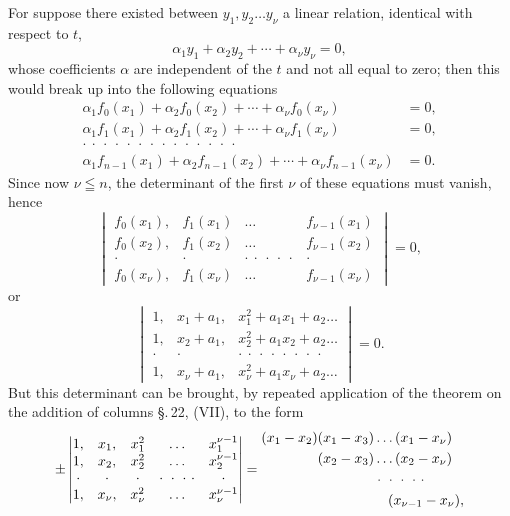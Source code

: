

For suppose there existed between $y_1, y_2 \ldots y_\nu$ a linear
relation, identical with respect to $t$,
\[
\alpha_1 y_1 + \alpha_2 y_2 + \cdots + \alpha_\nu y_\nu = 0,
\]
whose coefficients $\alpha$ are independent of the $t$ and not all equal
to zero; then this would break up into the following equations
\[
\begin{aligned}
\alpha_1 f_0(x_1) + \alpha_2 f_0(x_2) + \cdots + \alpha_\nu f_0(x_\nu) &= 0, \\
\alpha_1 f_1(x_1) + \alpha_2 f_1(x_2) + \cdots + \alpha_\nu f_1(x_\nu) &= 0, \\
\cdot\ \cdot\ \cdot\ \cdot\ \cdot\ \cdot\ \cdot\ \cdot\ \cdot\ \cdot\ \cdot\ \cdot\ \cdot\ \cdot & \\
\alpha_1 f_{n-1}(x_1) + \alpha_2 f_{n-1}(x_2) + \cdots + \alpha_\nu f_{n-1}(x_\nu) &= 0.
\end{aligned}
\]
Since now $\nu \leqq n$,
the determinant of the first $\nu$
of these equations must vanish, hence
\[
\begin{vmatrix}
f_0(x_1), & f_1(x_1) & \ldots & f_{\nu-1}(x_1) \\
f_0(x_2), & f_1(x_2) & \ldots & f_{\nu-1}(x_2) \\
\cdot & \cdot & \cdot\ \cdot\ \cdot\ \cdot\ \cdot & \cdot \\
f_0(x_\nu), & f_1(x_\nu) & \ldots & f_{\nu-1}(x_\nu)
\end{vmatrix}
= 0,
\]
or
\[
\begin{vmatrix}
1, & x_1 + a_1, & x_1^2 + a_1 x_1 + a_2 \ldots \\
1, & x_2 + a_1, & x_2^2 + a_1 x_2 + a_2 \ldots \\
\cdot & \cdot & \cdot\ \cdot\ \cdot\ \cdot\ \cdot\ \cdot\ \cdot\ \cdot \\
1, & x_\nu + a_1, & x_\nu^2 + a_1 x_\nu + a_2 \ldots
\end{vmatrix}
= 0.
\]
But this determinant can be brought, by repeated application
of the theorem on the addition of columns \S.\,22, (VII),
to the form
\[
\pm
\begin{vmatrix}
1, & x_1, & x_1^2 & \ldots & x_1^{\nu-1} \\
1, & x_2, & x_2^2 & \ldots & x_2^{\nu-1} \\
\cdot & \cdot & \cdot & \cdot\ \cdot\ \cdot\ \cdot & \cdot \\
1, & x_\nu, & x_\nu^2 & \ldots & x_\nu^{\nu-1}
\end{vmatrix}
=
\begin{aligned}
&(x_1 - x_2)(x_1 - x_3) \ldots (x_1 - x_\nu) \\
&\hphantom{(x_1 - x_2)}(x_2 - x_3) \ldots (x_2 - x_\nu) \\
&\hphantom{(x_1 - x_2)(x_2 - x_3)}\cdot\ \cdot\ \cdot\ \cdot\ \cdot \\
&\hphantom{(x_1 - x_2)(x_2 - x_3)\cdot\cdot}(x_{\nu-1} - x_\nu),
\end{aligned}
\]
